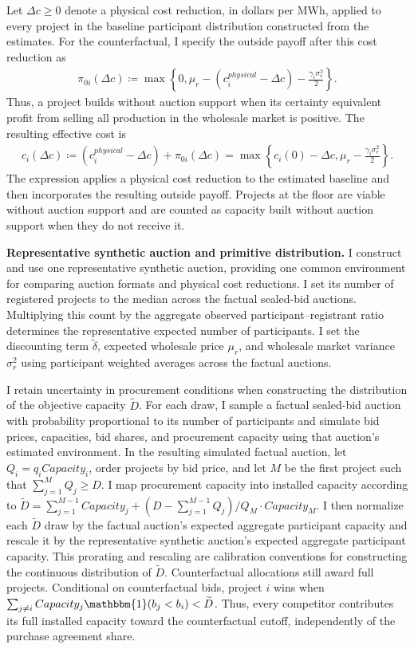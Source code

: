 \documentclass[12pt]{article}
\theoremstyle{definition} %
\newcommand{\I}{\mathbbm{1}}
\begin{document}
Let $\Delta c\geq0$ denote a physical cost reduction, in dollars per MWh, applied to every project in the baseline participant distribution constructed from the estimates. For the counterfactual, I specify the outside payoff after this cost reduction as
\begin{align*}
\pi_{0i}(\Delta c)
\coloneqq\max\left\{0,\mu_r-(c_i^{physical}-\Delta c)
-\frac{\gamma_i\sigma_r^2}{2}\right\}.
\end{align*}
Thus, a project builds without auction support when its certainty equivalent profit from selling all production in the wholesale market is positive. The resulting effective cost is
\begin{align*}
c_i(\Delta c)
\coloneqq (c_i^{physical}-\Delta c)+\pi_{0i}(\Delta c)
=\max\left\{c_i(0)-\Delta c,
\mu_r-\frac{\gamma_i\sigma_r^2}{2}\right\}.
\end{align*}
The expression applies a physical cost reduction to the estimated baseline and then incorporates the resulting outside payoff. Projects at the floor are viable without auction support and are counted as capacity built without auction support when they do not receive it.

\textbf{Representative synthetic auction and primitive distribution.} I construct and use one representative synthetic auction, providing one common environment for comparing auction formats and physical cost reductions. I set its number of registered projects to the median across the factual sealed-bid auctions. Multiplying this count by the aggregate observed participant--registrant ratio determines the representative expected number of participants. I set the discounting term $\tilde\delta$, expected wholesale price $\mu_r$, and wholesale market variance $\sigma_r^2$ using participant weighted averages across the factual auctions.

I retain uncertainty in procurement conditions when constructing the distribution of the objective capacity $\widetilde D$. For each draw, I sample a factual sealed-bid auction with probability proportional to its number of participants and simulate bid prices, capacities, bid shares, and procurement capacity using that auction's estimated environment. In the resulting simulated factual auction, let $Q_i=q_iCapacity_i$, order projects by bid price, and let $M$ be the first project such that $\sum_{j=1}^M Q_j\geq D$. I map procurement capacity into installed capacity according to $\widetilde D=\sum_{j=1}^{M-1}Capacity_j+(D-\sum_{j=1}^{M-1}Q_j)/Q_M \cdot Capacity_M$. I then normalize each $\widetilde D$ draw by the factual auction's expected aggregate participant capacity and rescale it by the representative synthetic auction's expected aggregate participant capacity. This prorating and rescaling are calibration conventions for constructing the continuous distribution of $\widetilde D$. Counterfactual allocations still award full projects. Conditional on counterfactual bids, project $i$ wins when $\sum_{j\neq i}Capacity_j\I(b_j<b_i)<\widetilde D$. Thus, every competitor contributes its full installed capacity toward the counterfactual cutoff, independently of the purchase agreement share.
\end{document}
